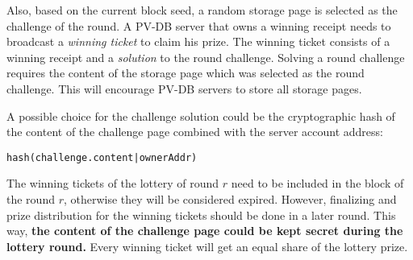 Also, based on the current block seed, a random storage page is
selected as the challenge of the round. A PV-DB server that owns a winning receipt needs to broadcast a \emph{winning
ticket} to claim his prize. The winning ticket consists of a winning receipt and a \emph{solution} to the round
challenge. Solving a round challenge requires the content of the storage page which was selected as the round
challenge. This will encourage PV-DB servers to store all storage pages.

A possible choice for the challenge solution could be the cryptographic hash of the content of the challenge
page combined with the server account address:

\texttt{hash(challenge.content|ownerAddr)}

The winning tickets of the lottery of round $r$ need to be included in the block of the round $r$,
otherwise they will be considered expired. However, finalizing and prize distribution for the winning tickets
should be done in a later round. This way, \textbf{the content of the challenge page could be
kept secret during the lottery round.} Every winning ticket will get an equal share of the lottery prize.
